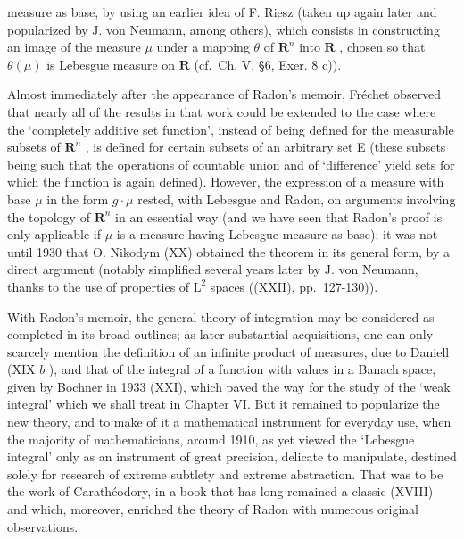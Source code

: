 measure as base, by using an earlier idea of F. Riesz (taken up again later and popularized by J. von Neumann, among others), which consists in constructing an image of the measure \(\mu\) under a mapping \(\theta\) of \(\mathbf{R}^n\) into \(\mathbf{R}\) , chosen so that \(\theta(\mu)\) is Lebesgue measure on \(\mathbf{R}\) (cf.~Ch. V, §6, Exer. 8 c)).

Almost immediately after the appearance of Radon's memoir, Fréchet observed that nearly all of the results in that work could be extended to the case where the `completely additive set function', instead of being defined for the measurable subsets of \(\mathbf{R}^n\) , is defined for certain subsets of an arbitrary set E (these subsets being such that the operations of countable union and of `difference' yield sets for which the function is again defined). However, the expression of a measure with base \(\mu\) in the form \(g \cdot \mu\) rested, with Lebesgue and Radon, on arguments involving the topology of \(\mathbf{R}^n\) in an essential way (and we have seen that Radon's proof is only applicable if \(\mu\) is a measure having Lebesgue measure as base); it was not until 1930 that O. Nikodym (XX) obtained the theorem in its general form, by a direct argument (notably simplified several years later by J. von Neumann, thanks to the use of properties of \(\mathrm{L}^2\) spaces ((XXII), pp.~127-130)).

With Radon's memoir, the general theory of integration may be considered as completed in its broad outlines; as later substantial acquisitions, one can only scarcely mention the definition of an infinite product of measures, due to Daniell (XIX \(b\) ), and that of the integral of a function with values in a Banach space, given by Bochner in 1933 (XXI), which paved the way for the study of the `weak integral' which we shall treat in Chapter VI. But it remained to popularize the new theory, and to make of it a mathematical instrument for everyday use, when the majority of mathematicians, around 1910, as yet viewed the `Lebesgue integral' only as an instrument of great precision, delicate to manipulate, destined solely for research of extreme subtlety and extreme abstraction. That was to be the work of Carathéodory, in a book that has long remained a classic (XVIII) and which, moreover, enriched the theory of Radon with numerous original observations.

